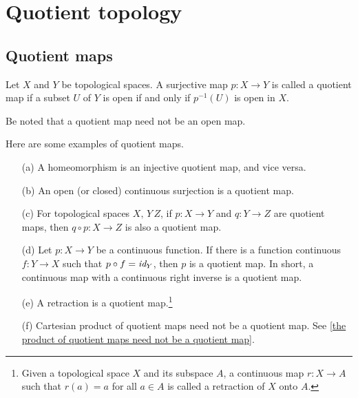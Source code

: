 \section{Quotient topology}

\subsection{Quotient maps}

\begin{defi}
    Let $X$ and $Y$ be topological spaces.
    A surjective map $p: X\rightarrow Y$ is called a quotient map if a subset $U$ of $Y$ is open if and only if $p^{-1}(U)$ is open in $X$.
\end{defi}
\begin{rmk}
    Be noted that a quotient map need not be an open map.
\end{rmk}
\begin{exmp}\label{examples of quotient maps}
    Here are some examples of quotient maps.
    \begin{enumerate}
        \item[(a)]
        {
            A homeomorphism is an injective quotient map, and vice versa.
        }
        \item[(b)]
        {
            An open (or closed) continuous surjection is a quotient map.
        }
        \item[(c)]
        {
            For topological spaces $X,\, Y\, Z$, if $p: X\rightarrow Y$ and $q: Y\rightarrow Z$ are quotient maps, then $q\circ p: X\rightarrow Z$ is also a quotient map.
        }
        \item[(d)]
        {
            Let $p: X\rightarrow Y$ be a continuous function.
            If there is a function continuous $f: Y\rightarrow X$ such that $p\circ f=\textit{id}_{Y}$, then $p$ is a quotient map.
            In short, a continuous map with a continuous right inverse is a quotient map.
        }
        \item[(e)]
        {
            A retraction is a quotient map.\footnote{Given a topological space $X$ and its subspace $A$, a continuous map $r: X\rightarrow A$ such that $r(a)=a$ for all $a\in A$ is called a retraction of $X$ onto $A$.}            
        }
        \item[(f)]
        {
            Cartesian product of quotient maps need not be a quotient map.
            See \cref{the product of quotient maps need not be a quotient map}.
        }
    \end{enumerate}
\end{exmp}

